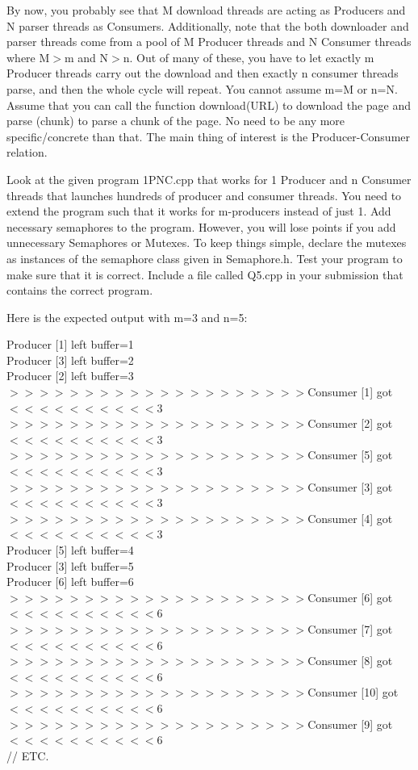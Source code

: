 \documentclass[12pt]{article}
\begin{document}
By now, you probably see that M download threads are acting as Producers and N parser threads as Consumers. Additionally, note that the both downloader and parser threads come from a pool of M Producer threads and N Consumer threads where M$>$m and N$>$n. Out of many of these, you have to let exactly m Producer threads carry out the download and then exactly n consumer threads parse, and then the whole cycle will repeat. You cannot assume m=M or n=N. Assume that you can call the function download(URL) to download the page and parse (chunk) to parse a chunk of the page. No need to be any more specific/concrete than that. The main thing of interest is the Producer-Consumer relation.  

Look at the given program 1PNC.cpp that works for 1 Producer and n Consumer threads that launches hundreds of producer and consumer threads. You need to extend the program such that it works for m-producers instead of just 1. Add necessary semaphores to the program. However, you will lose points if you add unnecessary Semaphores or Mutexes. To keep things simple, declare the mutexes as instances of the semaphore class given in  Semaphore.h. Test your program to make sure that it is correct. Include a file called Q5.cpp in your submission that contains the correct program.

Here is the expected output with m=3 and n=5:

\noindent
Producer [1] left buffer=1\\
Producer [3] left buffer=2\\
Producer [2] left buffer=3\\
$>>>>>>>>>>>>>>>>>>>>$Consumer [1] got $<<<<<<<<<<$3\\
$>>>>>>>>>>>>>>>>>>>>$Consumer [2] got $<<<<<<<<<<$3\\
$>>>>>>>>>>>>>>>>>>>>$Consumer [5] got $<<<<<<<<<<$3\\
$>>>>>>>>>>>>>>>>>>>>$Consumer [3] got $<<<<<<<<<<$3\\
$>>>>>>>>>>>>>>>>>>>>$Consumer [4] got $<<<<<<<<<<$3\\
Producer [5] left buffer=4\\
Producer [3] left buffer=5\\
Producer [6] left buffer=6\\
$>>>>>>>>>>>>>>>>>>>>$Consumer [6] got $<<<<<<<<<<$6\\
$>>>>>>>>>>>>>>>>>>>>$Consumer [7] got $<<<<<<<<<<$6\\
$>>>>>>>>>>>>>>>>>>>>$Consumer [8] got $<<<<<<<<<<$6\\
$>>>>>>>>>>>>>>>>>>>>$Consumer [10] got $<<<<<<<<<<$6\\
$>>>>>>>>>>>>>>>>>>>>$Consumer [9] got $<<<<<<<<<<$6\\
// ETC.\\
\end{document}
